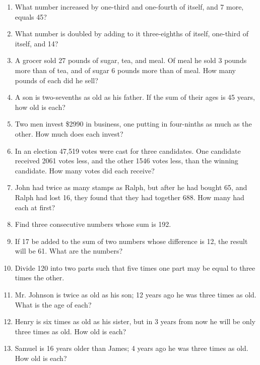 \documentclass{book}
\begin{document}
\begin{enumerate}
\item What number increased by one-third and one-fourth
of itself, and 7 more, equals 45?

\item What number is doubled by adding to it three-eighths
of itself, one-third of itself, and 14?

\item A grocer sold 27 pounds of sugar, tea, and meal.
Of meal he sold 3 pounds more than of tea, and of sugar
6 pounds more than of meal. How many pounds of each
did he sell?

\item A son is two-sevenths as old as his father. If the
sum of their ages is 45 years, how old is each?

\item Two men invest \$2990 in business, one putting in
four-ninths as much as the other. How much does each
invest?

\item In an election 47,519 votes were cast for three candidates.
One candidate received 2061 votes less, and the
other 1546 votes less, than the winning candidate. How
many votes did each receive?

\item John had twice as many stamps as Ralph, but after
he had bought 65, and Ralph had lost 16, they found that
they had together 688. How many had each at first?

\item Find three consecutive numbers whose sum is 192.

\item If 17 be added to the sum of two numbers whose
difference is 12, the result will be 61. What are the
numbers?

\item Divide 120 into two parts such that five times one
part may be equal to three times the other.

\item Mr. Johnson is twice as old as his son; 12 years
ago he was three times as old. What is the age of each?

\item Henry is six times as old as his sister, but in 3 years
from now he will be only three times as old. How old is
each?

\item Samuel is 16 years older than James; 4 years ago
he was three times as old. How old is each?


\end{enumerate}
\end{document}
